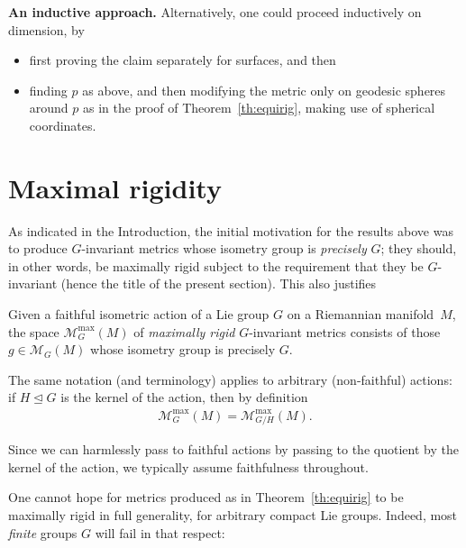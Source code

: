 \documentclass[10pt,a4paper]{amsart}
\numberwithin{equation}{section}
\begin{document}
\medskip

{\bf An inductive approach.} Alternatively, one could proceed inductively on dimension, by
\begin{itemize}\itemsep=0pt
\item first proving the claim separately for surfaces, and then
\item finding $p$ as above, and then modifying the metric only on geodesic spheres around $p$ as in the proof of Theorem~\ref{th:equirig}, making use of spherical coordinates.
\end{itemize}

\section{Maximal rigidity}\label{se:maxrig}

As indicated in the Introduction, the initial motivation for the results above was to produce $G$-invariant metrics whose isometry group is {\it precisely} $G$; they should, in other words, be maximally rigid subject to the requirement that they be $G$-invariant (hence the title of the present section). This also justifies

\begin{Notation}
 Given a faithful isometric action of a Lie group $G$ on a Riemannian manifold~$M$, the space $\mathcal{M}_G^{\max}(M)$ of {\it maximally rigid} $G$-invariant metrics consists of those $g\in \mathcal{M}_G(M)$ whose isometry group is precisely $G$.

 The same notation (and terminology) applies to arbitrary (non-faithful) actions: if $H\trianglelefteq G$ is the kernel of the action, then by definition
 \begin{gather*}
 \mathcal{M}_G^{\max}(M) = \mathcal{M}_{G/H}^{\max}(M).
 \end{gather*}
\end{Notation}
Since we can harmlessly pass to faithful actions by passing to the quotient by the kernel of the action, we typically assume faithfulness throughout.

One cannot hope for metrics produced as in Theorem~\ref{th:equirig} to be maximally rigid in full generality, for arbitrary compact Lie groups. Indeed, most {\it finite} groups $G$ will fail in that respect:
\end{document}
